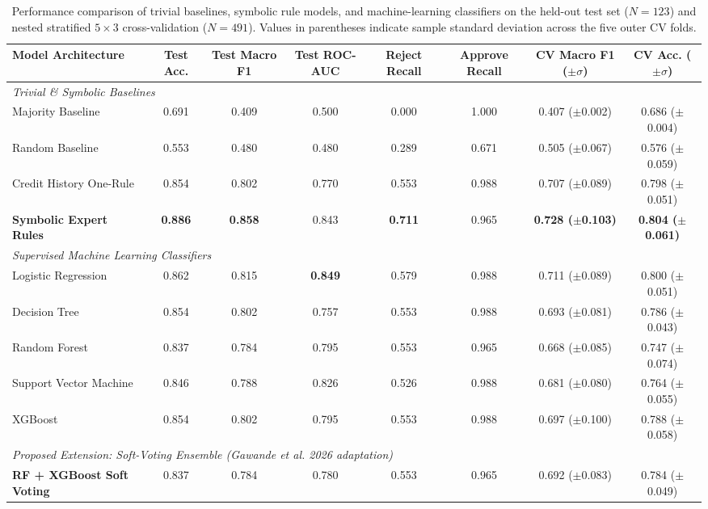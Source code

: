 \documentclass{COMPXXXX}
\begin{document}
\begin{table}[t]
\centering
\caption{Performance comparison of trivial baselines, symbolic rule models, and machine-learning classifiers on the held-out test set ($N=123$) and nested stratified $5\times 3$ cross-validation ($N=491$). Values in parentheses indicate sample standard deviation across the five outer CV folds.}
\label{tab:results}
\small
\begin{tabular}{lccccccc}
\toprule
\textbf{Model Architecture} & \textbf{Test Acc.} & \textbf{Test Macro F1} & \textbf{Test ROC-AUC} & \textbf{Reject Recall} & \textbf{Approve Recall} & \textbf{CV Macro F1 ($\pm \sigma$)} & \textbf{CV Acc. ($\pm \sigma$)} \\
\midrule
\multicolumn{8}{l}{\textit{Trivial \& Symbolic Baselines}} \\
Majority Baseline & 0.691 & 0.409 & 0.500 & 0.000 & 1.000 & 0.407 ($\pm$0.002) & 0.686 ($\pm$0.004) \\
Random Baseline & 0.553 & 0.480 & 0.480 & 0.289 & 0.671 & 0.505 ($\pm$0.067) & 0.576 ($\pm$0.059) \\
Credit History One-Rule & 0.854 & 0.802 & 0.770 & 0.553 & 0.988 & 0.707 ($\pm$0.089) & 0.798 ($\pm$0.051) \\
\textbf{Symbolic Expert Rules} & \textbf{0.886} & \textbf{0.858} & 0.843 & \textbf{0.711} & 0.965 & \textbf{0.728 ($\pm$0.103)} & \textbf{0.804 ($\pm$0.061)} \\
\midrule
\multicolumn{8}{l}{\textit{Supervised Machine Learning Classifiers}} \\
Logistic Regression & 0.862 & 0.815 & \textbf{0.849} & 0.579 & 0.988 & 0.711 ($\pm$0.089) & 0.800 ($\pm$0.051) \\
Decision Tree & 0.854 & 0.802 & 0.757 & 0.553 & 0.988 & 0.693 ($\pm$0.081) & 0.786 ($\pm$0.043) \\
Random Forest & 0.837 & 0.784 & 0.795 & 0.553 & 0.965 & 0.668 ($\pm$0.085) & 0.747 ($\pm$0.074) \\
Support Vector Machine & 0.846 & 0.788 & 0.826 & 0.526 & 0.988 & 0.681 ($\pm$0.080) & 0.764 ($\pm$0.055) \\
XGBoost & 0.854 & 0.802 & 0.795 & 0.553 & 0.988 & 0.697 ($\pm$0.100) & 0.788 ($\pm$0.058) \\
\midrule
\multicolumn{8}{l}{\textit{Proposed Extension: Soft-Voting Ensemble (Gawande et al. 2026 adaptation)}} \\
\textbf{RF + XGBoost Soft Voting} & 0.837 & 0.784 & 0.780 & 0.553 & 0.965 & 0.692 ($\pm$0.083) & 0.784 ($\pm$0.049) \\
\bottomrule
\end{tabular}
\end{table}
\end{document}
